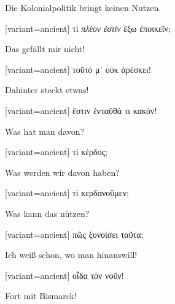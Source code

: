 Die Kolonialpolitik bringt keinen Nutzen.

\switchcolumn

\begin{greek}[variant=ancient]%
τί \emph{πλέον ἐστὶν} ἔξω ἐποικεῖν;

\end{greek}%
\switchcolumn*

Das gefällt mir nicht!

\switchcolumn

\begin{greek}[variant=ancient]%
τοῦτό μ᾽ οὐκ ἀρέσκει!

\end{greek}%
\switchcolumn*

Dahinter steckt etwas!

\switchcolumn

\begin{greek}[variant=ancient]%
ἔστιν ἐνταῦθά τι κακόν!

\end{greek}%
\switchcolumn*

Was hat man davon?

\switchcolumn

\begin{greek}[variant=ancient]%
τί κέρδος;

\end{greek}%
\switchcolumn*

Was werden wir davon haben?

\switchcolumn

\begin{greek}[variant=ancient]%
τί κερδανοῦμεν;

\end{greek}%
\switchcolumn*

Was kann das nützen?

\switchcolumn

\begin{greek}[variant=ancient]%
πῶς ξυνοίσει ταῦτα;

\end{greek}%
\switchcolumn*

Ich weiß schon, wo man hinaus\textcompwordmark{}will!

\switchcolumn

\begin{greek}[variant=ancient]%
οἶδα τὸν νοῦν!

\end{greek}%
\switchcolumn*

Fort mit Bis\textcompwordmark{}marck! 

